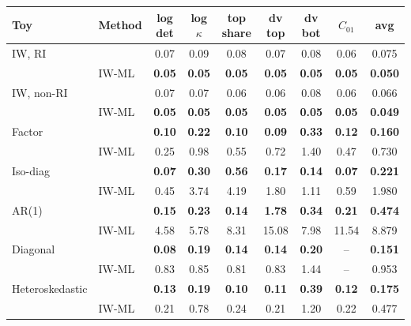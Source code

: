 \begin{tabular}{llccccccc}
    \toprule
    Toy & Method & log det & log $\kappa$ & top share & dv top & dv bot & $C_{01}$ & avg \\
    \midrule
    IW, RI & \scsi{} & 0.07 & 0.09 & 0.08 & 0.07 & 0.08 & 0.06 & 0.075 \\
     & IW-ML & \textbf{0.05} & \textbf{0.05} & \textbf{0.05} & \textbf{0.05} & \textbf{0.05} & \textbf{0.05} & \textbf{0.050} \\
    \midrule
    IW, non-RI & \scsi{} & 0.07 & 0.07 & 0.06 & 0.06 & 0.08 & 0.06 & 0.066 \\
     & IW-ML & \textbf{0.05} & \textbf{0.05} & \textbf{0.05} & \textbf{0.05} & \textbf{0.05} & \textbf{0.05} & \textbf{0.049} \\
    \midrule
    Factor & \scsi{} & \textbf{0.10} & \textbf{0.22} & \textbf{0.10} & \textbf{0.09} & \textbf{0.33} & \textbf{0.12} & \textbf{0.160} \\
     & IW-ML & 0.25 & 0.98 & 0.55 & 0.72 & 1.40 & 0.47 & 0.730 \\
    \midrule
    Iso-diag & \scsi{} & \textbf{0.07} & \textbf{0.30} & \textbf{0.56} & \textbf{0.17} & \textbf{0.14} & \textbf{0.07} & \textbf{0.221} \\
     & IW-ML & 0.45 & 3.74 & 4.19 & 1.80 & 1.11 & 0.59 & 1.980 \\
    \midrule
    AR(1) & \scsi{} & \textbf{0.15} & \textbf{0.23} & \textbf{0.14} & \textbf{1.78} & \textbf{0.34} & \textbf{0.21} & \textbf{0.474} \\
     & IW-ML & 4.58 & 5.78 & 8.31 & 15.08 & 7.98 & 11.54 & 8.879 \\
    \midrule
    Diagonal & \scsi{} & \textbf{0.08} & \textbf{0.19} & \textbf{0.14} & \textbf{0.14} & \textbf{0.20} & -- & \textbf{0.151} \\
     & IW-ML & 0.83 & 0.85 & 0.81 & 0.83 & 1.44 & -- & 0.953 \\
    \midrule
    Heteroskedastic & \scsi{} & \textbf{0.13} & \textbf{0.19} & \textbf{0.10} & \textbf{0.11} & \textbf{0.39} & \textbf{0.12} & \textbf{0.175} \\
     & IW-ML & 0.21 & 0.78 & 0.24 & 0.21 & 1.20 & 0.22 & 0.477 \\
    \bottomrule
\end{tabular}
